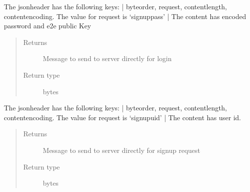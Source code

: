 \documentclass[letterpaper,10pt,english]{sphinxmanual}
\begin{document}
\begin{fulllineitems}
\begin{fulllineitems}
\end{fulllineitems}


\begin{fulllineitems}
\label{\detokenize{Message:Message.Message._create_signuppass_request}}
The jsonheader has the following keys: |
byteorder, request, content\sphinxhyphen{}length, content\sphinxhyphen{}encoding. The value for request is ‘signuppass’ |
The content has encoded password and e2e public Key
\begin{quote}\begin{description}
\item[{Returns}] \leavevmode
Message to send to server directly for login

\item[{Return type}] \leavevmode
bytes

\end{description}\end{quote}

\end{fulllineitems}


\begin{fulllineitems}
\label{\detokenize{Message:Message.Message._create_signupuid_request}}
The jsonheader has the following keys: |
byteorder, request, content\sphinxhyphen{}length, content\sphinxhyphen{}encoding. The value for request is ‘signupuid’ |
The content has user id.
\begin{quote}\begin{description}
\item[{Returns}] \leavevmode
Message to send to server directly for signup request

\item[{Return type}] \leavevmode
bytes

\end{description}\end{quote}

\end{fulllineitems}


\end{fulllineitems}
\end{document}
